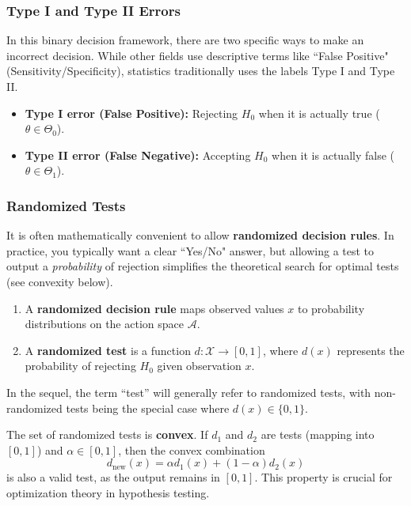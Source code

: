 \subsubsection{Type I and Type II Errors}
In this binary decision framework, there are two specific ways to make an incorrect decision. While other fields use descriptive terms like ``False Positive" (Sensitivity/Specificity), statistics traditionally uses the labels Type I and Type II.

\begin{itemize}
    \item \textbf{Type I error (False Positive):} Rejecting \(H_0\) when it is actually true (\(\theta \in \Theta_0\)).
    \item \textbf{Type II error (False Negative):} Accepting \(H_0\) when it is actually false (\(\theta \in \Theta_1\)).
\end{itemize}

\subsubsection{Randomized Tests}
It is often mathematically convenient to allow \textbf{randomized decision rules}. In practice, you typically want a clear ``Yes/No" answer, but allowing a test to output a \textit{probability} of rejection simplifies the theoretical search for optimal tests (see convexity below).

\begin{definition}
    \leavevmode
\begin{enumerate}
    \item[(i)] A \textbf{randomized decision rule} maps observed values \(x\) to probability distributions on the action space \(\mathcal{A}\).
    \item[(ii)] A \textbf{randomized test} is a function \(d: \mathcal{X} \to [0,1]\), where \(d(x)\) represents the probability of rejecting \(H_0\) given observation \(x\).
\end{enumerate}
In the sequel, the term ``test'' will generally refer to randomized tests, with non-randomized tests being the special case where \(d(x) \in \{0, 1\}\).
\end{definition}

\begin{remark}[Convexity]
The set of randomized tests is \textbf{convex}.
If \(d_1\) and \(d_2\) are tests (mapping into \([0,1]\)) and \(\alpha \in [0,1]\), then the convex combination
\[ d_{\text{new}}(x) = \alpha d_1(x) + (1-\alpha) d_2(x) \]
is also a valid test, as the output remains in \([0,1]\). This property is crucial for optimization theory in hypothesis testing.
\end{remark}

